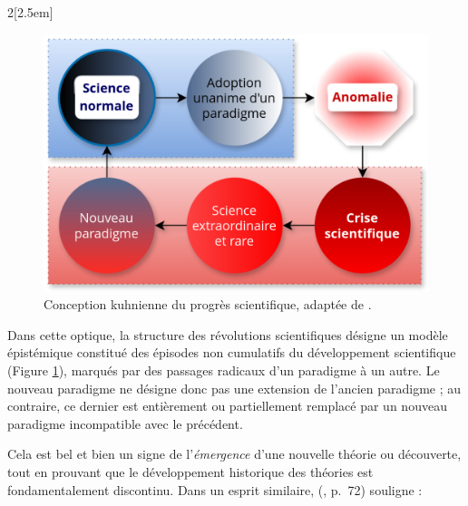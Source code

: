 \begin{multicols}{2}[\columnsep2.5em] 
\begin{figure}[H] %
    \centering
    \includegraphics[width=\linewidth]{img/changement_paradigme.png}
    \caption{Conception kuhnienne du progrès scientifique, adaptée de \citet{amiri2012}.}
    \label{fig:changement_paradigme}
\end{figure}
\columnbreak

Dans cette optique, la structure des révolutions scientifiques désigne un modèle épistémique constitué des épisodes non cumulatifs du développement scientifique (Figure \ref{fig:changement_paradigme}), marqués par des passages radicaux d'un paradigme à un autre.  Le nouveau paradigme ne désigne donc pas une extension de l'ancien paradigme ; au contraire, ce dernier est entièrement ou partiellement remplacé par un nouveau paradigme incompatible avec le précédent. \end{multicols} Cela est bel et bien un signe de l'\textit{émergence} d'une nouvelle théorie ou découverte, tout en prouvant que le développement historique des théories est fondamentalement discontinu. Dans un esprit similaire, \citeauthor{bachelard1970idealisme} (\citeyear{bachelard1970idealisme}, p.~72) souligne :


%

